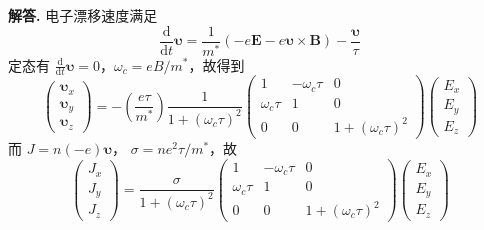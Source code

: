 \documentclass[11pt]{ctexart}
\newenvironment{solution}{\par\noindent\textbf{解答. }}{\par}
\begin{document}
\begin{solution}
    电子漂移速度满足
    \begin{equation*}
        \frac{\text{d}}{\text{d}t}\bm{\upsilon} = \frac{1}{m^*}(-e\mathbf{E} - e\bm{\upsilon}\times\mathbf{B}) - \frac{\bm{\upsilon}}{\tau}
    \end{equation*}
    定态有 $\displaystyle\frac{\text{d}}{\text{d}t}\bm{\upsilon} = 0$，$\omega_c = eB / m^*$，故得到 
    \begin{equation*}
        \begin{pmatrix}
            \bm{\upsilon}_x \\
            \bm{\upsilon}_y \\
            \bm{\upsilon}_z
        \end{pmatrix}
        =
        -\left(\frac{e\tau}{m^*}\right)\frac{1}{1 + (\omega_c\tau)^2}
        \begin{pmatrix}
            1 & -\omega_c\tau & 0 \\
            \omega_c\tau & 1 & 0 \\
            0 & 0 & 1 + (\omega_c\tau)^2
        \end{pmatrix}
        \begin{pmatrix}
            E_x \\
            E_y \\
            E_z
        \end{pmatrix}
    \end{equation*}
    而 $J = n(-e)\bm{\upsilon}$， $\sigma = ne^2\tau / m^*$，故
    \begin{equation*}
        \begin{pmatrix}
            J_x \\
            J_y \\
            J_z
        \end{pmatrix}
        =
        \frac{\sigma}{1 + (\omega_c\tau)^2}
        \begin{pmatrix}
            1 & -\omega_c\tau & 0 \\
            \omega_c\tau & 1 & 0 \\
            0 & 0 & 1 + (\omega_c\tau)^2
        \end{pmatrix}
        \begin{pmatrix}
            E_x \\
            E_y \\
            E_z
        \end{pmatrix}
    \end{equation*}
\end{solution}
\end{document}
